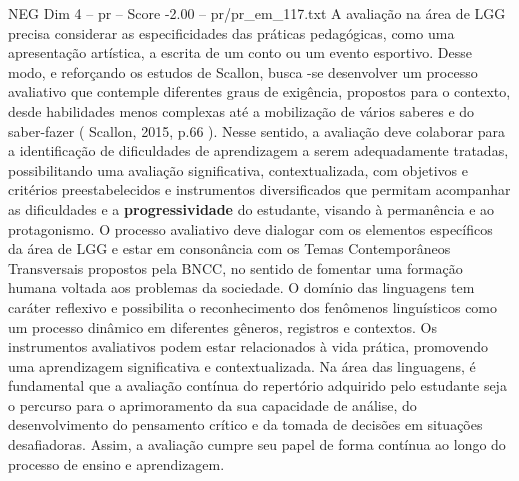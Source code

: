 \begin{textsample}{NEG Dim 4 – pr – Score -2.00 – pr/pr\_em\_117.txt}
A avaliação na área de LGG precisa considerar as especificidades das práticas pedagógicas, como uma apresentação artística, a escrita de um conto ou um evento esportivo.
Desse modo, e reforçando os estudos de Scallon, busca -se desenvolver um processo avaliativo que contemple diferentes graus de exigência, propostos para o contexto, desde habilidades menos complexas até a mobilização de vários saberes e do saber-fazer ( Scallon, 2015, p.66 ).
Nesse sentido, a avaliação deve colaborar para a identificação de dificuldades de aprendizagem a serem adequadamente tratadas, possibilitando uma avaliação significativa, contextualizada, com objetivos e critérios preestabelecidos e instrumentos diversificados que permitam acompanhar as dificuldades e a \textbf{progressividade} do estudante, visando à permanência e ao protagonismo.
O processo avaliativo deve dialogar com os elementos específicos da área de LGG e estar em consonância com os Temas Contemporâneos Transversais propostos pela BNCC, no sentido de fomentar uma formação humana voltada aos problemas da sociedade.
O domínio das linguagens tem caráter reflexivo e possibilita o reconhecimento dos fenômenos linguísticos como um processo dinâmico em diferentes gêneros, registros e contextos.
Os instrumentos avaliativos podem estar relacionados à vida prática, promovendo uma aprendizagem significativa e contextualizada.
Na área das linguagens, é fundamental que a avaliação contínua do repertório adquirido pelo estudante seja o percurso para o aprimoramento da sua capacidade de análise, do desenvolvimento do pensamento crítico e da tomada de decisões em situações desafiadoras.
Assim, a avaliação cumpre seu papel de forma contínua ao longo do processo de ensino e aprendizagem.

\end{textsample}
